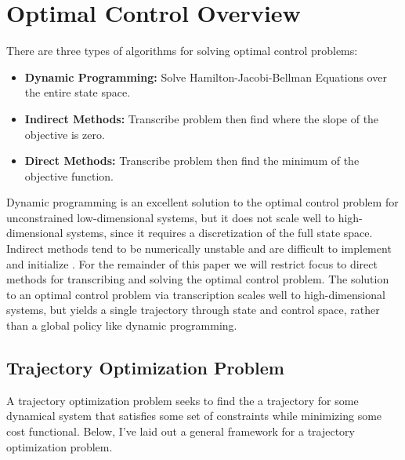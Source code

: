 \section{Optimal Control Overview}

There are three types of algorithms for solving optimal control problems\cite{Diehl2009}:
\begin{itemize}
\setlength{\itemsep}{0pt}
	\item{\bf Dynamic Programming: } Solve Hamilton-Jacobi-Bellman Equations over the entire state space.
	\item{\bf Indirect Methods: } Transcribe problem then find where the slope of the objective is zero.
	\item{\bf Direct Methods: } Transcribe problem then find the minimum of the objective function.
\end{itemize}

Dynamic programming is an excellent solution to the optimal control problem for unconstrained low-dimensional systems, but it does not scale well to high-dimensional systems, since it requires a discretization of the full state space. Indirect methods tend to be numerically unstable and are difficult to implement and initialize \cite{Betts2010}. For the remainder of this paper we will restrict focus to direct methods for transcribing and solving the optimal control problem. The solution to an optimal control problem via transcription scales well to high-dimensional systems, but yields a single trajectory through state and control space, rather than a global policy like dynamic programming.

\subsection{Trajectory Optimization Problem}
\label{sec:TrajectoryOptimizationProblem}

A trajectory optimization problem seeks to find the a trajectory for some dynamical system that satisfies some set of constraints while minimizing some cost functional. Below, I've laid out a general framework for a trajectory optimization problem.\\ \\

